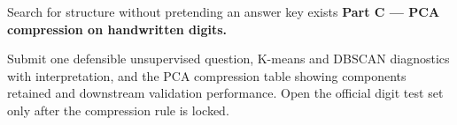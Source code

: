 \begin{labproject}{Search for structure without pretending an answer key exists}
\medskip\noindent\textbf{Part C --- PCA compression on handwritten digits.}\par







\end{labproject}

\begin{labdeliverable}
Submit one defensible unsupervised question, K-means and DBSCAN diagnostics with interpretation, and the PCA compression table showing components retained and downstream validation performance. Open the official digit test set only after the compression rule is locked.
\end{labdeliverable}
